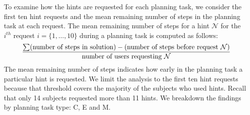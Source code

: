 To examine how the hints are requested for each planning task, we consider the first ten hint requests and the mean remaining number of steps in the planning task at each request.
The mean remaining number of steps for a hint $\mathcal{N}$ for the $i^{th}$ request  $i= \lbrace 1, \ldots, 10\rbrace$ during a planning task  is computed as follows:
\begin{equation}
\frac{\sum (\textup{number of steps in solution}) - (\textup{number of steps before request } \mathcal{N})}{\textup{number of users requesting } \mathcal{N}}
\end{equation}
The mean remaining number of steps indicates how early in the planning task a particular hint is requested.
We limit the analysis to the first ten hint requests because that threshold covers the majority of the subjects who used hints.
Recall that only 14 subjects requested more than 11 hints.
We breakdown the findings by planning task type: C, E and M.

